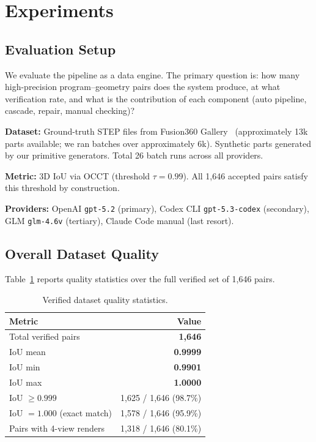 \section{Experiments}
\label{sec:exp}

\subsection{Evaluation Setup}

We evaluate the pipeline as a data engine. The primary question is: how many high-precision program--geometry pairs does the system produce, at what verification rate, and what is the contribution of each component (auto pipeline, cascade, repair, manual checking)?

\noindent\textbf{Dataset:} Ground-truth STEP files from Fusion360 Gallery~\cite{fusion360gallery} (approximately 13k parts available; we ran batches over approximately 6k). Synthetic parts generated by our primitive generators. Total 26 batch runs across all providers.

\noindent\textbf{Metric:} 3D IoU via OCCT (threshold $\tau = 0.99$). All 1,646 accepted pairs satisfy this threshold by construction.

\noindent\textbf{Providers:} OpenAI \texttt{gpt-5.2} (primary), Codex CLI \texttt{gpt-5.3-codex} (secondary), GLM \texttt{glm-4.6v} (tertiary), Claude Code manual (last resort).

\subsection{Overall Dataset Quality}

Table~\ref{tab:quality} reports quality statistics over the full verified set of 1,646 pairs.

\begin{table}[h]
\centering
\small
\caption{Verified dataset quality statistics.}
\label{tab:quality}
\begin{tabular}{lr}
\toprule
\textbf{Metric} & \textbf{Value} \\
\midrule
Total verified pairs & \textbf{1,646} \\
IoU mean & \textbf{0.9999} \\
IoU min & \textbf{0.9901} \\
IoU max & \textbf{1.0000} \\
IoU $\geq 0.999$ & 1,625 / 1,646 (98.7\%) \\
IoU $= 1.000$ (exact match) & 1,578 / 1,646 (95.9\%) \\
Pairs with 4-view renders & 1,318 / 1,646 (80.1\%) \\
\bottomrule
\end{tabular}
\end{table}

